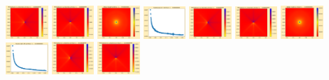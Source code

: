 \documentclass[11pt]{article}
\begin{document}
\includegraphics[width=0.11875\textwidth]{frame0098fig2.png}
\includegraphics[width=0.11875\textwidth]{frame0098fig3.png}
\includegraphics[width=0.11875\textwidth]{frame0099fig0.png}
\includegraphics[width=0.11875\textwidth]{frame0099fig1.png}
\includegraphics[width=0.11875\textwidth]{frame0099fig2.png}
\includegraphics[width=0.11875\textwidth]{frame0099fig3.png}
\vskip 10pt 
\includegraphics[width=0.11875\textwidth]{frame0100fig0.png}
\includegraphics[width=0.11875\textwidth]{frame0100fig1.png}
\includegraphics[width=0.11875\textwidth]{frame0100fig2.png}
\includegraphics[width=0.11875\textwidth]{frame0100fig3.png}
\end{document}
